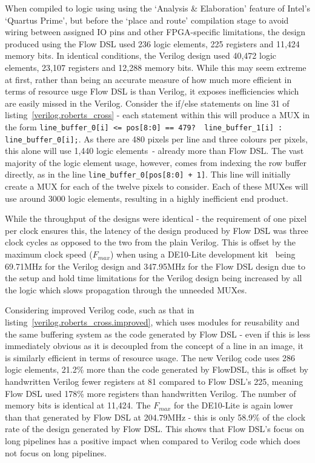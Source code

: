 When compiled to logic using using the `Analysis \& Elaboration' feature of Intel's `Quartus Prime'\cite{quartus}, but before the `place and route' compilation stage to avoid wiring between assigned IO pins and other FPGA-specific limitations, the design produced using the Flow DSL used 236 logic elements, 225 registers and 11,424 memory bits. In identical conditions, the Verilog design used 40,472 logic elements, 23,107 registers and 12,288 memory bits. While this may seem extreme at first, rather than being an accurate measure of how much more efficient in terms of resource usge Flow DSL is than Verilog, it exposes inefficiencies which are easily missed in the Verilog. Consider the if/else statements on line 31 of listing \ref{verilog.roberts_cross} \hyphen{} each statement within this will produce a MUX in the form \lstinline|line_buffer_0[i] <= pos[8:0] == 479?  line_buffer_1[i] : line_buffer_0[i];|. As there are 480 pixels per line and three colours per pixels, this alone will use 1,440 logic elements \hyphen{} already more than Flow DSL. The vast majority of the logic element usage, however, comes from indexing the row buffer directly, as in the line \lstinline|line_buffer_0[pos[8:0] + 1]|. This line will initially create a MUX for each of the twelve pixels to consider. Each of these MUXes will use around 3000 logic elements, resulting in a highly inefficient end product.

While the throughput of the designs were identical \hyphen{} the requirement of one pixel per clock ensures this, the latency of the design produced by Flow DSL was three clock cycles as opposed to the two from the plain Verilog. This is offset by the maximum clock speed ($F_{max}$) when using a DE10-Lite development kit \cite{terasic} being 69.71MHz for the Verilog design and 347.95MHz for the Flow DSL design due to the setup and hold time limitations for the Verilog design being increased by all the logic which slows propagation through the unneeded MUXes.

Considering improved Verilog code, such as that in listing \ref{verilog.roberts_cross.improved}, which uses modules for reusability and the same buffering system as the code generated by Flow DSL \hyphen{} even if this is less immediately obvious as it is decoupled from the concept of a line in an image, it is similarly efficient in terms of resource usage. The new Verilog code uses 286 logic elements, 21.2\% more than the code generated by FlowDSL, this is offset by handwritten Verilog fewer registers at 81 compared to Flow DSL's 225, meaning Flow DSL used 178\% more registers than handwritten Verilog. The number of memory bits is identical at 11,424. The $F_{max}$ for the DE10-Lite is again lower than that generated by Flow DSL at 204.79MHz \hyphen{} this is only 58.9\% of the clock rate of the design generated by Flow DSL. This shows that Flow DSL's focus on long pipelines has a positive impact when compared to Verilog code which does not focus on long pipelines.

